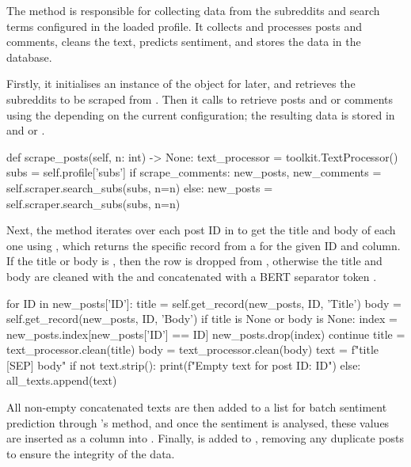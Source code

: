 The  method is responsible for collecting data from the subreddits and search terms configured in the loaded profile. It collects and processes posts and comments, cleans the text, predicts sentiment, and stores the data in the database.

Firstly, it initialises an instance of the  object for later, and retrieves the subreddits to be scraped from . Then it calls  to retrieve posts and or comments using the  depending on the current configuration; the resulting data is stored in  and or .

\begin{python}
def scrape_posts(self, n: int) -> None:
    text_processor = toolkit.TextProcessor()
    subs = self.profile['subs']
    if scrape_comments:
        new_posts, new_comments = self.scraper.search_subs(subs, n=n)
    else:
        new_posts = self.scraper.search_subs(subs, n=n)
\end{python}

Next, the method iterates over each post ID in  to get the title and body of each one using , which returns the specific record from a  for the given ID and column. If the title or body is , then the row is dropped from , otherwise the title and body are cleaned with the  and concatenated with a BERT separator token .

\begin{python}
for ID in new_posts['ID']:
    title = self.get_record(new_posts, ID, 'Title')
    body = self.get_record(new_posts, ID, 'Body')
    if title is None or body is None:
        index = new_posts.index[new_posts['ID'] == ID]
        new_posts.drop(index)
        continue
    title = text_processor.clean(title)
    body = text_processor.clean(body)
    text = f"{title} [SEP] {body}"
    if not text.strip():
        print(f"Empty text for post ID: {ID}")
    else:
        all_texts.append(text)
\end{python}

All non-empty concatenated texts are then added to a list for batch sentiment prediction through 's  method, and once the sentiment is analysed, these values are inserted as a column into . Finally,  is added to , removing any duplicate posts to ensure the integrity of the data.

